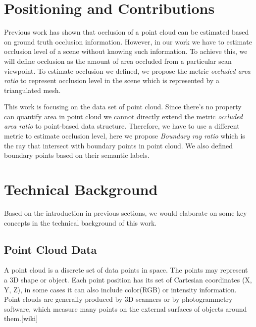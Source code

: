 \documentclass[11pt, a4paper,oneside,chapterprefix=false]{scrbook}
\begin{document}
\section{Positioning and Contributions}

Previous work has shown that occlusion of a point cloud can be estimated based on ground truth occlusion information. However, in our work we have to estimate occlusion level of a scene without knowing such information. To achieve this, we will define occlusion as the amount of area occluded from a particular scan viewpoint. To estimate occlusion we defined, we propose the metric \emph{occluded area ratio} to represent occlusion level in the scene which is represented by a triangulated mesh. 

\vspace{10pt}

This work is focusing on the data set of point cloud. Since there's no property can quantify area in point cloud we cannot directly extend the metric \emph{occluded area ratio} to point-based data structure. Therefore, we have to use a different metric to estimate occlusion level, here we propose \emph{Boundary ray ratio} which is the ray that intersect with boundary points in point cloud. We also defined boundary points based on their semantic labels.

\section{Technical Background}

Based on the introduction in previous sections, we would elaborate on some key concepts in the technical background of this work.

\subsection{Point Cloud Data}

A point cloud is a discrete set of data points in space. The points may represent a 3D shape or object. Each point position has its set of Cartesian coordinates (X, Y, Z), in some cases it can also include color(RGB) or intensity information. Point clouds are generally produced by 3D scanners or by photogrammetry software, which measure many points on the external surfaces of objects around them.[wiki] 

\vspace{10pt}
\end{document}

